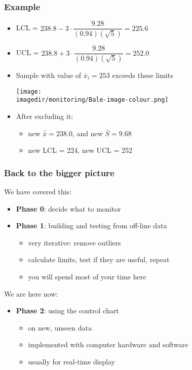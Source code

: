 \begin{frame}\frametitle{Example}
	\begin{itemize}
		\item	LCL = $238.8 - 3 \cdot \dfrac{9.28}{(0.94)(\sqrt{5})} = 225.6$
		\item	UCL = $238.8 + 3 \cdot \dfrac{9.28}{(0.94)(\sqrt{5})} = 252.0$
		
		\vspace{6pt}
		\item	Sample with value of $\bar{x}_i = 253$ exceeds these limits
		
		\begin{center}
			\texttt{[image: \\imagedir/monitoring/Bale-image-colour.png]}
		\end{center}
		
		
		\item	After excluding it:
		\begin{itemize}
			\item	new $\bar{\bar{x}} = 238.0$, and new $\bar{S} = 9.68$
			\item	new LCL = 224, new UCL = 252
		\end{itemize}
	\end{itemize}
	
\end{frame}


\begin{frame}\frametitle{Back to the bigger picture}
	
	{\color{myOrange}We have covered this:}
	\begin{itemize}
		\item	\textbf{Phase 0}: decide what to monitor
		\item	\textbf{Phase 1}: building and testing from off-line data
		\begin{itemize}
			\item	very iterative: remove outliers
			\item	calculate limits, test if they are useful, repeat
			\item	you will spend most of your time here
		\end{itemize}
	\end{itemize}
	
	\vspace{12pt}
	{\color{myOrange}We are here now:}
	\begin{itemize}
		\item	\textbf{Phase 2}: using the control chart
		\begin{itemize}
			\item	on new, unseen data
			\item	implemented with computer hardware and software
			\item	usually for real-time display
		\end{itemize}
	\end{itemize}
\end{frame}


